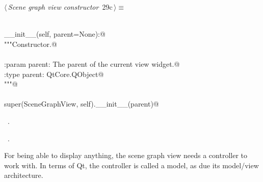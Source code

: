 \documentclass[
    a4paper,      %
    10pt,         %
    openright,    %
    notitlepage,  %
    parskip=half, %
]{scrreprt}       %
\theoremstyle{definition}                    %
\begin{document}
\begin{flushleft} \small
\begin{minipage}{\linewidth}\label{scrap28}\raggedright\small
{} $\langle\,${\itshape Scene graph view constructor}\nobreak\ {\footnotesize {29c}}$\,\rangle\equiv$
\vspace{-1ex}
\begin{list}{}{} \item
\mbox{}\lstinline@@\\
\mbox{}\lstinline@def __init__(self, parent=None):@\\
\mbox{}\lstinline@    """Constructor.@\\
\mbox{}\lstinline@@\\
\mbox{}\lstinline@    :param parent:        The parent of the current view widget.@\\
\mbox{}\lstinline@    :type parent:         QtCore.QObject@\\
\mbox{}\lstinline@    """@\\
\mbox{}\lstinline@@\\
\mbox{}\lstinline@    super(SceneGraphView, self).__init__(parent)@\\
\mbox{}\lstinline@@{\NWsep}
\end{list}
\vspace{-1.5ex}
\footnotesize
\begin{list}{}{\setlength{\itemsep}{-\parsep}\setlength{\itemindent}{-\leftmargin}}
\item \NWtxtMacroDefBy\ .
\item \NWtxtMacroRefIn\ .

\item{}
\end{list}
\end{minipage}\vspace{4ex}
\end{flushleft}
For being able to display anything, the scene graph view needs a controller to
work with. In terms of Qt, the controller is called a model, as due its
model/view architecture.
\end{document}
